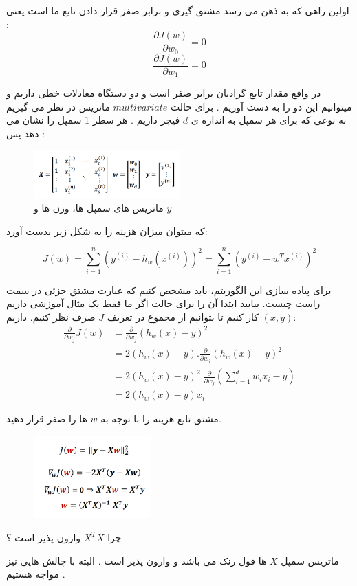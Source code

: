 \documentclass[12pt]{article}
\begin{document}
اولین راهی که به ذهن می رسد مشتق گیری و برابر صفر قرار دادن تابع ما است یعنی : 
$$\frac{\partial J(w)}{\partial w_0} 
 = 0 $$
 $$\frac{\partial J(w)}{\partial w_1} 
 = 0 $$

  در واقع مقدار تابع گرادیان برابر صفر است و دو دستگاه معادلات خطی داریم و میتوانیم این دو را به دست آوریم .
 برای حالت 
 $multivariate$
 ماتریس در نظر می گیریم به نوعی که برای هر سمپل به اندازه ی 
 $d$
 فیچر داریم .
 هر سطر 1 سمپل را نشان می دهد 
 پس :

\begin{figure}[htbp]
  \centering
  \includegraphics[width=0.50\textwidth]{etc/Images/Fig5.png} 
  \caption{ماتریس های سمپل ها، وزن ها و $y$}
  \label{fig5}
\end{figure}

که میتوان میزان هزینه را به شکل زیر بدست آورد:

\[
J(w)=\sum_{i=1}^{n}(y^{(i)}-h_{w}(x^{(i)}))^2=\sum_{i=1}^{n}(y^{(i)}-w^{T}x^{(i)})^2
\]

برای پیاده سازی این الگوریتم، باید مشخص کنیم که عبارت مشتق جزئی در سمت راست چیست. بیایید ابتدا آن را برای حالت اگر ما فقط یک مثال آموزشی داریم $(x, y)$ کار کنیم تا بتوانیم از مجموع در تعریف $J$ صرف نظر کنیم. داریم:
\begin{align*}
\frac{\partial}{\partial w_j}J(w) &= \frac{\partial}{\partial w_j} (h_w(x) - y)^2 \\
&= 2 (h_w(x) - y) . \frac{\partial}{\partial w_j}(h_w(x) - y)^2 \\
&= 2 (h_w(x) - y)^2  . \frac{\partial}{\partial w_j} \left(\sum_{i=1}^{d} w_i x_i - y \right)
\\
&=2 (h_w(x) - y) x_i
\end{align*}

مشتق تابع هزینه را با توجه به $w$ ها را صفر قرار دهید.
\begin{figure}[htbp]
  \centering
  \includegraphics[width=0.4\textwidth]{etc/Images/Fig6.png} 
  \label{fig6}
\end{figure}

چرا 
$X^TX $
وارون پذیر است ؟

ماتریس سمپل $X$ ها فول رنک می باشد و وارون پذیر است .
البته با چالش هایی نیز مواجه هستیم .
\end{document}
